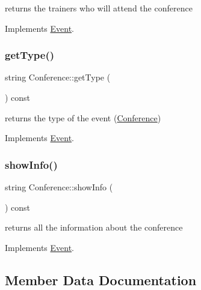 returns the trainers who will attend the conference 



Implements \mbox{\hyperlink{classEvent_a11aad3e5a7ee85bc61b6811d050c5d70}{Event}}.

\mbox{\label{classConference_ad1cf07b29a4c4cc36483603ef9536186}} 
\subsubsection{\texorpdfstring{get\+Type()}{getType()}}
{\footnotesize\ttfamily string Conference\+::get\+Type (\begin{DoxyParamCaption}{ }\end{DoxyParamCaption}) const\hspace{0.3cm}{\ttfamily [virtual]}}



returns the type of the event (\mbox{\hyperlink{classConference}{Conference}}) 



Implements \mbox{\hyperlink{classEvent_a224dbd9a9aee5937ba0c8ea1a056af1f}{Event}}.

\mbox{\label{classConference_a7a2f7b38c728f487d82356d3c671ef88}} 
\subsubsection{\texorpdfstring{show\+Info()}{showInfo()}}
{\footnotesize\ttfamily string Conference\+::show\+Info (\begin{DoxyParamCaption}{ }\end{DoxyParamCaption}) const\hspace{0.3cm}{\ttfamily [virtual]}}



returns all the information about the conference 



Implements \mbox{\hyperlink{classEvent_aaa38f467e933c57190d43351bdb817be}{Event}}.



\subsection{Member Data Documentation}
\mbox{\label{classConference_ab3acc9b9aec3a4dbcfd18d1611337ecb}} 
